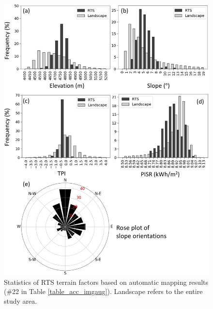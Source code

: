 \documentclass[authoryear,preprint,review,12pt]{elsarticle}
\begin{document}
\begin{figure}
	\centering
	\includegraphics[width=13cm]{figures/terrain_var_fig_mapped_trim.jpg}
	\caption{Statistics of RTS terrain factors based on automatic mapping results  (\#22 in Table \ref{table_acc_imgaug}). Landscape refers to the entire study area.}
	\label{fig_terrain_factors}
\end{figure}
\end{document}
